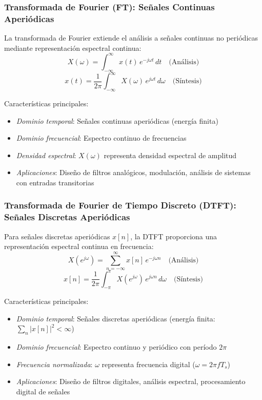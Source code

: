 \documentclass[
  11pt,
  letterpaper,
   addpoints,
   answers
  ]{exam}
\begin{document}
\subsubsection*{Transformada de Fourier (FT): Señales Continuas Aperiódicas}
La transformada de Fourier extiende el análisis a señales continuas no periódicas mediante representación espectral continua:
\begin{equation}
X(\omega) = \int_{-\infty}^{\infty} x(t)\,e^{-j\omega t}\,dt \quad \text{(Análisis)}
\end{equation}
\begin{equation}
x(t) = \frac{1}{2\pi}\int_{-\infty}^{\infty} X(\omega)\,e^{j\omega t}\,d\omega \quad \text{(Síntesis)}
\end{equation}

Características principales:
\begin{itemize}
\item \textit{Dominio temporal}: Señales continuas aperiódicas (energía finita)
\item \textit{Dominio frecuencial}: Espectro continuo de frecuencias
\item \textit{Densidad espectral}: \(X(\omega)\) representa densidad espectral de amplitud
\item \textit{Aplicaciones}: Diseño de filtros analógicos, modulación, análisis de sistemas con entradas transitorias
\end{itemize}

\subsubsection*{Transformada de Fourier de Tiempo Discreto (DTFT): Señales Discretas Aperiódicas}
Para señales discretas aperiódicas \(x[n]\), la DTFT proporciona una representación espectral continua en frecuencia:
\begin{equation}
X(e^{j\omega}) = \sum_{n=-\infty}^{\infty} x[n]\,e^{-j\omega n} \quad \text{(Análisis)}
\end{equation}
\begin{equation}
x[n] = \frac{1}{2\pi}\int_{-\pi}^{\pi} X(e^{j\omega})\,e^{j\omega n}\,d\omega \quad \text{(Síntesis)}
\end{equation}

Características principales:
\begin{itemize}
\item \textit{Dominio temporal}: Señales discretas aperiódicas (energía finita: \(\sum_{n} |x[n]|^2 < \infty\))
\item \textit{Dominio frecuencial}: Espectro continuo y periódico con período \(2\pi\)
\item \textit{Frecuencia normalizada}: \(\omega\) representa frecuencia digital (\(\omega = 2\pi f T_s\))
\item \textit{Aplicaciones}: Diseño de filtros digitales, análisis espectral, procesamiento digital de señales
\end{itemize}
\end{document}
